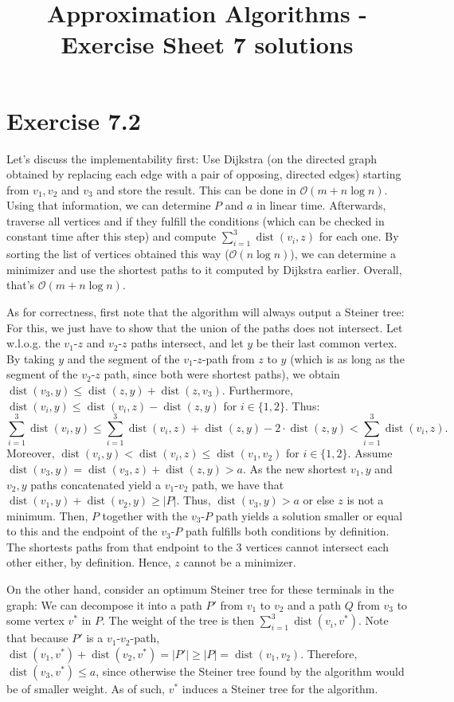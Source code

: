 \documentclass[oneside,a4paper]{amsart}
\DeclareMathOperator{\dist}{dist}
\begin{document}
\title{Approximation Algorithms - Exercise Sheet 7 solutions}
\maketitle{}
\section*{Exercise 7.2}
Let's discuss the implementability first: Use Dijkstra (on the directed graph obtained by replacing each edge with a pair of opposing, directed edges) starting from $v_1, v_2$ and $v_3$ and store the result. This can be done in $\mathcal{O}(m + n \log n)$. Using that information, we can determine $P$ and $a$ in linear time. Afterwards, traverse all vertices and if they fulfill the conditions (which can be checked in constant time after this step) and compute $\sum_{i=1}^3 \operatorname{dist}(v_i, z)$ for each one. By sorting the list of vertices obtained this way ($\mathcal{O}(n \log n)$), we can determine a minimizer and use the shortest paths to it computed by Dijkstra earlier. Overall, that's $\mathcal{O}(m + n \log n)$.

As for correctness, first note that the algorithm will always output a Steiner tree: For this, we just have to show that the union of the paths does not intersect. Let w.l.o.g. the $v_1$-$z$ and $v_2$-$z$ paths intersect, and let $y$ be their last common vertex. By taking $y$ and the segment of the $v_1$-$z$-path from $z$ to $y$ (which is as long as the segment of the $v_2$-$z$ path, since both were shortest paths), we obtain $\dist(v_3, y) \leq \dist(z, y) + \dist(z, v_3)$. Furthermore, $\dist(v_i, y) \leq \dist(v_i, z) - \dist(z, y)$ for $i \in \{ 1, 2\}$. Thus:
\[
	\sum_{i=1}^3 \dist(v_i, y) \leq \sum_{i=1}^3 \dist(v_i, z) + \dist(z, y) - 2 \cdot \dist(z, y) < \sum_{i=1}^3 \dist(v_i, z).
\]
Moreover, $\dist(v_i, y) < \dist(v_i, z) \leq \dist(v_1, v_2)$ for $i \in \{ 1, 2\}$. Assume $\dist(v_3, y) = \dist(v_3, z) + \dist(z, y) > a$. As the new shortest $v_1, y$ and $v_2, y$ paths concatenated yield a $v_1$-$v_2$ path, we have that $\dist(v_1, y) + \dist(v_2, y) \geq |P|$. Thus, $\dist(v_3, y) > a$ or else $z$ is not a minimum. Then, $P$ together with the $v_3$-$P$ path yields a solution smaller or equal to this and the endpoint of the $v_3$-$P$ path fulfills both conditions by definition. The shortests paths from that endpoint to the 3 vertices cannot intersect each other either, by definition. Hence, $z$ cannot be a minimizer.

On the other hand, consider an optimum Steiner tree for these terminals in the graph: We can decompose it into a path $P'$ from $v_1$ to $v_2$ and a path $Q$ from $v_3$ to some vertex $v^*$ in $P$. The weight of the tree is then $\sum_{i=1}^3 \dist(v_i, v^*)$. Note that because $P'$ is a $v_1$-$v_2$-path, $\dist(v_1, v^*) + \dist(v_2, v^*) = |P'| \geq |P| = \dist(v_1, v_2)$. Therefore, $\dist(v_3, v^*) \leq a$, since otherwise the Steiner tree found by the algorithm would be of smaller weight. As of such, $v^*$ induces a Steiner tree for the algorithm.
\end{document}
